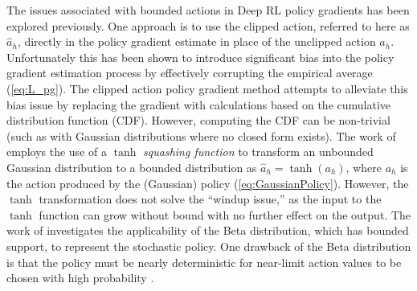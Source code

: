 \documentclass{UnderReview}
\begin{document}
The issues associated with bounded actions in Deep RL policy gradients has been explored previously.  One approach is to use the clipped action, referred to here as $\hat a_h$, directly in the policy gradient estimate in place of the unclipped action $a_h$.  Unfortunately this has been shown to introduce significant bias into the policy gradient estimation process \cite{chou2017improving} by effectively corrupting the empirical average (\ref{eq:L_pg}).  The clipped action policy gradient method \cite{fujita2018clipped} attempts to alleviate this bias issue by replacing the gradient with calculations based on the cumulative distribution function (CDF).  However, computing the CDF can be non-trivial (such as with Gaussian distributions where no closed form exists).  The work of \cite{haarnoja2018soft} employs the use of a $\tanh$ \textit{squashing function} to transform an unbounded Gaussian distribution to a bounded distribution as $\hat a_h = \tanh(a_h)$, where $a_h$ is the action produced by the (Gaussian) policy (\ref{eq:GaussianPolicy}).  However, the $\tanh$ transformation does not solve the ``windup issue,'' as the input to the $\tanh$ function can grow without bound with no further effect on the output.  The work of \cite{chou2017improving} investigates the applicability of the Beta distribution, which has bounded support, to represent the stochastic policy.  One drawback of the Beta distribution is that the policy must be nearly deterministic for near-limit action values to be chosen with high probability \cite{fujita2018clipped}.
\end{document}
